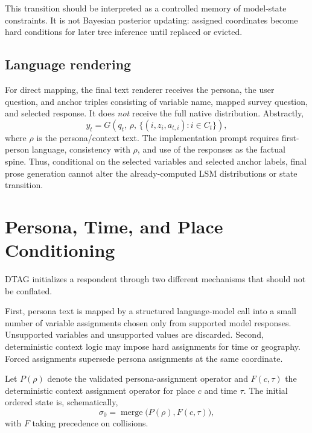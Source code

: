 \documentclass[journal]{IEEEtran}
\newcommand{\1}{\mathbf{1}}
\begin{document}
This transition should be interpreted as a controlled memory of model-state constraints. It is not Bayesian posterior updating: assigned coordinates become hard conditions for later tree inference until replaced or evicted.

\subsection{Language rendering}

For direct mapping, the final text renderer receives the persona, the user question, and anchor triples consisting of variable name, mapped survey question, and selected response. It does \emph{not} receive the full native distribution. Abstractly,
\begin{equation}
  y_t=G\!\left(q_t,\,\rho,\,
       \{(i,z_i,a_{t,i}):i\in C_t\}\right),
  \label{eq:render}
\end{equation}
where $\rho$ is the persona/context text. The implementation prompt requires first-person language, consistency with $\rho$, and use of the responses as the factual spine. Thus, conditional on the selected variables and selected anchor labels, final prose generation cannot alter the already-computed LSM distributions or state transition.

\section{Persona, Time, and Place Conditioning}
\label{sec:context}

DTAG initializes a respondent through two different mechanisms that should not be conflated.

First, persona text is mapped by a structured language-model call into a small number of variable assignments chosen only from supported model responses. Unsupported variables and unsupported values are discarded. Second, deterministic context logic may impose hard assignments for time or geography. Forced assignments supersede persona assignments at the same coordinate.

Let $P(\rho)$ denote the validated persona-assignment operator and $F(c,\tau)$ the deterministic context assignment operator for place $c$ and time $\tau$. The initial ordered state is, schematically,
\begin{equation}
  \sigma_0=\operatorname{merge}\big(P(\rho),F(c,\tau)\big),
  \label{eq:init}
\end{equation}
with $F$ taking precedence on collisions.
\end{document}
